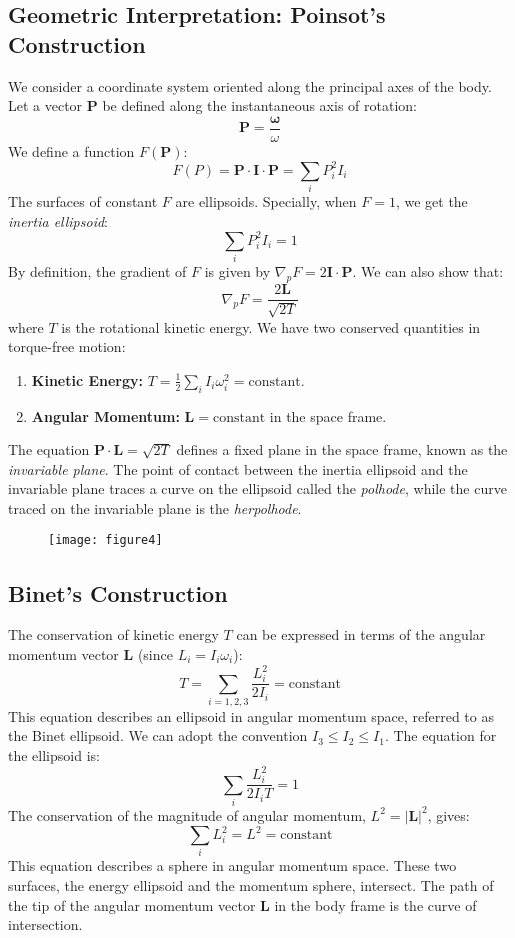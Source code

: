 \documentclass[12pt]{article}
\renewcommand{\vec}[1]{\mathbf{#1}}
\begin{document}
	\subsection{Geometric Interpretation: Poinsot's Construction}
	We consider a coordinate system oriented along the principal axes of the body. Let a vector $\vec{P}$ be defined along the instantaneous axis of rotation:
	$$
	\vec{P} = \frac{\vec{\omega}}{\omega}
	$$
	We define a function $F(\vec{P})$:
	$$
	F(P) = \vec{P} \cdot \mathbf{I} \cdot \vec{P} = \sum_i P_i^2 I_i
	$$
	The surfaces of constant $F$ are ellipsoids. Specially, when $F=1$, we get the \textit{inertia ellipsoid}:
	$$
	\sum_i P_i^2 I_i = 1
	$$
	By definition, the gradient of $F$ is given by $\nabla_p F = 2 \mathbf{I} \cdot \vec{P}$. We can also show that:
	$$
	\nabla_p F = \frac{2\vec{L}}{\sqrt{2T}}
	$$
	where $T$ is the rotational kinetic energy. We have two conserved quantities in torque-free motion:
	\begin{enumerate}
		\item \textbf{Kinetic Energy:} $T = \frac{1}{2} \sum_i I_i \omega_i^2 = \text{constant}$.
		\item \textbf{Angular Momentum:} $\vec{L} = \text{constant}$ in the space frame.
	\end{enumerate}
	The equation $\vec{P} \cdot \vec{L} = \sqrt{2T}$ defines a fixed plane in the space frame, known as the \textit{invariable plane}.
	The point of contact between the inertia ellipsoid and the invariable plane traces a curve on the ellipsoid called the \textit{polhode}, while the curve traced on the invariable plane is the \textit{herpolhode}.
	
	\begin{figure}[h]
		\centering
		\texttt{[image: figure4]}
		\caption{}
		\label{fig:figure4}
	\end{figure}
	
	\subsection{Binet's Construction}
	The conservation of kinetic energy $T$ can be expressed in terms of the angular momentum vector $\vec{L}$ (since $L_i = I_i \omega_i$):
	$$
	T = \sum_{i=1,2,3} \frac{L_i^2}{2I_i} = \text{constant}
	$$
	This equation describes an ellipsoid in angular momentum space, referred to as the Binet ellipsoid. We can adopt the convention $I_3 \le I_2 \le I_1$. The equation for the ellipsoid is:
	$$
	\sum_i \frac{L_i^2}{2I_i T} = 1
	$$
	The conservation of the magnitude of angular momentum, $L^2 = |\vec{L}|^2$, gives:
	$$
	\sum_i L_i^2 = L^2 = \text{constant}
	$$
	This equation describes a sphere in angular momentum space. These two surfaces, the energy ellipsoid and the momentum sphere, intersect. The path of the tip of the angular momentum vector $\vec{L}$ in the body frame is the curve of intersection.
	
\end{document}
